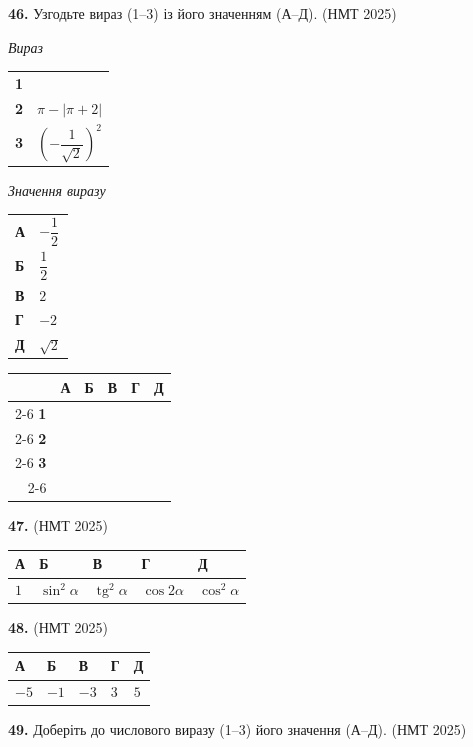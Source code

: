 \documentclass[14pt]{extarticle}
\newcommand{\answerTableTall}[5]{
\begin{center}
\begin{tabular}{|*{5}{>{\centering\arraybackslash}m{2.8cm}|}}
\hline
\rule[-0.3cm]{0pt}{0.8cm}\textbf{А} & \textbf{Б} & \textbf{В} & \textbf{Г} & \textbf{Д} \\
\hline
\rule[-0.9cm]{0pt}{2.0cm}#1 & 
\rule[-0.9cm]{0pt}{2.0cm}#2 & 
\rule[-0.9cm]{0pt}{2.0cm}#3 & 
\rule[-0.9cm]{0pt}{2.0cm}#4 & 
\rule[-0.9cm]{0pt}{2.0cm}#5 \\
\hline
\end{tabular}
\end{center}
}
\newcommand{\answerGrid}{
    \begingroup
    \renewcommand{\arraystretch}{1.3} 
    \setlength{\tabcolsep}{7pt} 
    \begin{tabular}{r|c|c|c|c|c|}
         \multicolumn{1}{c}{} & \multicolumn{1}{c}{\textbf{А}} & \multicolumn{1}{c}{\textbf{Б}} & \multicolumn{1}{c}{\textbf{В}} & \multicolumn{1}{c}{\textbf{Г}} & \multicolumn{1}{c}{\textbf{Д}} \\ \cline{2-6}
         \textbf{1} & & & & & \\ \cline{2-6}
         \textbf{2} & & & & & \\ \cline{2-6}
         \textbf{3} & & & & & \\ \cline{2-6}
    \end{tabular}
    \endgroup
}
\newcommand{\matchingLayout}[3]{
    \noindent
    \begin{minipage}[t]{0.40\textwidth}
       
        #1
    \end{minipage}%
    \hfill
    \begin{minipage}[t]{0.28\textwidth}
        
        #2
    \end{minipage}%
    \hfill
    \begin{minipage}[t]{0.30\textwidth}
        \vspace{0pt} %
        \begin{flushright}
        #3
        \end{flushright}
    \end{minipage}
}
\newcommand{\answerTable}[5]{
\begin{center}
\begin{tabular}{|*{5}{>{\centering\arraybackslash}m{2.8cm}|}}
\hline
\rule[-0.3cm]{0pt}{0.8cm}\textbf{А} & \textbf{Б} & \textbf{В} & \textbf{Г} & \textbf{Д} \\
\hline
\rule[-0.4cm]{0pt}{1.0cm}#1 & \rule[-0.4cm]{0pt}{1.0cm}#2 & \rule[-0.4cm]{0pt}{1.0cm}#3 & \rule[-0.4cm]{0pt}{1.0cm}#4 & \rule[-0.4cm]{0pt}{1.0cm}#5 \\
\hline
\end{tabular}
\end{center}
}
\newcommand{\nmtyear}[1]{\hfill{\small\color{yearcolor}(НМТ #1)}}
\begin{document}
\vspace{0.7cm}

\noindent\textbf{46.} Узгодьте вираз (1--3) із його значенням (А--Д). \nmtyear{2025}

\vspace{0.3cm}

\matchingLayout{
    \textit{Вираз} \par \vspace{0.2cm}
    \begin{tabular}{@{}p{0.5cm} l@{}}
    \textbf{1} & \trigStyle{$\sin\left(-\dfrac{\pi}{6}\right)$} \\[0.4cm]
    \textbf{2} & $\pi - |\pi+2|$ \\[0.4cm]
    \textbf{3} & $\left(-\dfrac{1}{\sqrt{2}}\right)^2$ \\
    \end{tabular}
}{
    \textit{Значення виразу} \par \vspace{0.2cm}
    \begin{tabular}{@{}p{0.5cm} l@{}}
    \textbf{А} & $-\dfrac{1}{2}$ \\[0.4cm]
    \textbf{Б} & $\dfrac{1}{2}$ \\[0.4cm]
    \textbf{В} & $2$ \\[0.2cm]
    \textbf{Г} & $-2$ \\[0.2cm]
    \textbf{Д} & $\sqrt{2}$ \\
    \end{tabular}
}{
    \answerGrid
}

\vspace{0.7cm}

\noindent\textbf{47.}  \nmtyear{2025}

\vspace{0.3cm}
\answerTableTall{$1$}{$\sin^2 \alpha$}{$\operatorname{tg}^2 \alpha$}{$\cos 2\alpha$}{$\cos^2 \alpha$}

\vspace{0.7cm}

\noindent\textbf{48.}  \nmtyear{2025}

\vspace{0.3cm}
\answerTable{$-5$}{$-1$}{$-3$}{$3$}{$5$}

\vspace{0.7cm}

\noindent\textbf{49.} Доберіть до числового виразу (1--3) його значення (А--Д). \nmtyear{2025}
\end{document}
